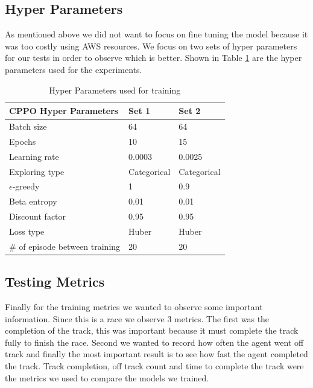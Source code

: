 \documentclass[journal]{IEEEtran}
\begin{document}
\subsection{Hyper Parameters}
As mentioned above we did not want to focus on fine tuning the model because it was too costly using AWS resources. We focus on two sets of hyper parameters for our tests in order to observe which is better.  Shown in Table \ref{hyper-parameters} are the hyper parameters used for the experiments.

\begin{table}
\centering
\caption{Hyper Parameters used for training}
\begin{tabular}{ | m{4cm} | m{4em}| m{4em} | } 
\hline
\textbf{CPPO Hyper Parameters} & \textbf{Set 1} & \textbf{Set 2} \\ 
\hline
Batch size & 64 & 64 \\ 
\hline
Epochs & 10 & 15 \\ 
\hline
Learning rate & 0.0003 & 0.0025 \\ 
\hline
Exploring type & Categorical & Categorical \\ 
\hline
$\epsilon$-greedy & 1 & 0.9 \\ 
\hline
Beta entropy & 0.01 & 0.01 \\ 
\hline
Discount factor & 0.95 & 0.95 \\ 
\hline
Loss type & Huber & Huber \\ 
\hline
\# of episode between training & 20 & 20 \\ 
\hline
\end{tabular}
\label{hyper-parameters}
\end{table}

\subsection{Testing Metrics}
Finally for the training metrics we wanted to observe some important information.  Since this is a race we observe 3 metrics.  The first was the completion of the track, this was important because it must complete the track fully to finish the race.  Second we wanted to record how often the agent went off track and finally the most important result is to see how fast the agent completed the track.  Track completion, off track count and time to complete the track were the metrics we used to compare the models we trained.
\end{document}
